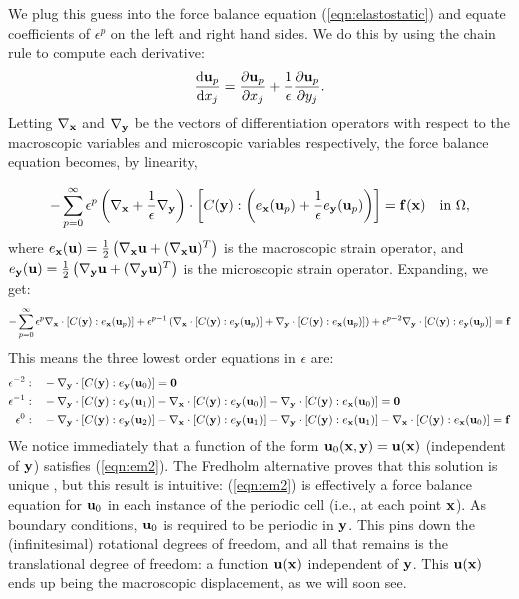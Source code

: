 \documentclass[10pt]{article}
\providecommand{\e}{\epsilon}
\providecommand{\pder}[2]{\frac{\partial #1}{\partial #2}}
\providecommand{\tder}[2]{\frac{\mathrm{d} #1}{\mathrm{d} #2}}
\begin{document}
We plug this guess into the force balance equation (\ref{eqn:elastostatic}) and
equate coefficients of $\e^p$ on the left and right hand sides. We do this by
using the chain rule to compute each derivative:
$$
\tder{{\bf u}_p}{x_j} = \pder{{\bf u}_p}{x_j} + \frac{1}{\e} \pder{{\bf u}_p}{y_j}.
$$
Letting $\nabla_{\bf x}$ and $\nabla_{\bf y}$ be the vectors of differentiation
operators with respect to the macroscopic variables and microscopic variables
respectively, the force balance equation becomes, by linearity,

$$
-\sum_{p = 0}^\infty \e^p \left(\nabla_{\bf x} + \frac{1}{\e} \nabla_{\bf y}\right)
    \cdot \left[C({\bf y}) : \left(e_{\bf x}({\bf u}_p) + \frac{1}{\e} e_{\bf y}({\bf u}_p) \right) \right]
    = {\bf f}({\bf x}) \quad \text{in } \Omega,
$$
where $e_{\bf x}({\bf u}) = \frac{1}{2} \left( \nabla_{\bf x} {\bf u} + (\nabla_{\bf x}
{\bf u})^T \right)$ is the macroscopic strain operator, and $e_{\bf y}({\bf u}) =
\frac{1}{2} \left( \nabla_{\bf y} {\bf u} + (\nabla_{\bf y} {\bf u})^T \right)$
is the microscopic strain operator. Expanding, we get:
$$
-\sum_{p = 0}^\infty \e^p \nabla_{\bf x} \cdot [C({\bf y}) : e_{\bf x}({\bf u}_p)] +
\e^{p - 1} \left(\nabla_{\bf x} \cdot [C({\bf y}) : e_{\bf y}({\bf u}_p)] +
                 \nabla_{\bf y} \cdot [C({\bf y}) : e_{\bf x}({\bf u}_p)] \right) +
                 \e^{p - 2} \nabla_{\bf y} \cdot [C({\bf y}) : e_{\bf y}({\bf u}_p)] = {\bf f}
$$
This means the three lowest order equations in $\e$ are:
\begin{align}
    \e^{-2}:\quad  &-\nabla_{\bf y} \cdot [C({\bf y}) : e_{\bf y}({\bf u}_0)] = {\bf 0} \label{eqn:em2} \\
    \e^{-1}:\quad  &-\nabla_{\bf y} \cdot [C({\bf y}) : e_{\bf y}({\bf u}_1)] - 
                     \nabla_{\bf x} \cdot [C({\bf y}) : e_{\bf y}({\bf u}_0)] -
                     \nabla_{\bf y} \cdot [C({\bf y}) : e_{\bf x}({\bf u}_0)] = {\bf 0} \label{eqn:em1} \\
    \e^{ 0}:\quad  &-\nabla_{\bf y} \cdot [C({\bf y}) : e_{\bf y}({\bf u}_2)] - 
                     \nabla_{\bf x} \cdot [C({\bf y}) : e_{\bf y}({\bf u}_1)] -
                     \nabla_{\bf y} \cdot [C({\bf y}) : e_{\bf x}({\bf u}_1)] -
                     \nabla_{\bf x} \cdot [C({\bf y}) : e_{\bf x}({\bf u}_0)] = {\bf f} \label{eqn:e0}
\end{align}
We notice immediately that a function of the form ${\bf u}_0({\bf x}, {\bf y}) = {\bf u}({\bf x})$
(independent of ${\bf y}$) satisfies (\ref{eqn:em2}). The Fredholm alternative
proves that this solution is unique \cite[Lemma 2.3.21]{allaire2002shape}, but
this result is intuitive: (\ref{eqn:em2}) is effectively a force balance
equation for ${\bf u}_0$ in each instance of the periodic cell (i.e., at each
point ${\bf x}$). As boundary conditions, ${\bf u}_0$ is required to be
periodic in ${\bf y}$. This pins down the (infinitesimal) rotational degrees of
freedom, and all that remains is the translational degree of freedom: a
function ${\bf u}({\bf x})$ independent of ${\bf y}$. This ${\bf u}({\bf x})$ ends up
being the macroscopic displacement, as we will soon see.
\end{document}
